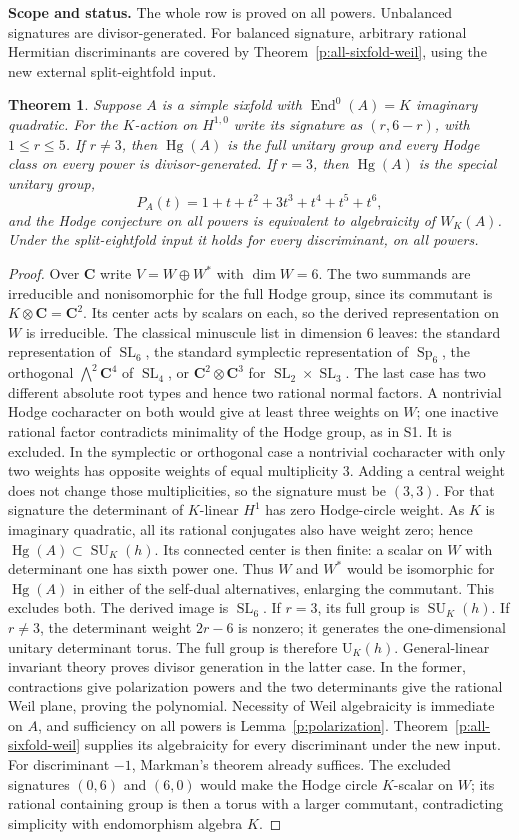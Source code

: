 \documentclass[10pt,reqno]{article}
\theoremstyle{emphasizedplain}
\newtheorem{theorem}{Theorem}[section]
\theoremstyle{emphasizeddefinition}
\theoremstyle{emphasizeddefinition}
\DeclareMathOperator{\End}{End}
\DeclareMathOperator{\Hg}{Hg}
\DeclareMathOperator{\Sp}{Sp}
\DeclareMathOperator{\SL}{SL}
\DeclareMathOperator{\SU}{SU}
\newcommand{\C}{\mathbf C}
\newcommand{\status}[1]{%
  \par\nobreak\smallskip\noindent
  {\setlength{\fboxsep}{7pt}%
   \colorbox{ScopeBackground}{%
    \parbox{\dimexpr\linewidth-2\fboxsep\relax}{%
     \small\textbf{\textcolor{HeadingInk}{Scope and status.}} #1}}}%
  \par\nobreak\medskip}
\renewcommand{\small}{\fontsize{8.4}{10}\selectfont}
\begin{document}
\status{The whole row is proved on all powers. Unbalanced signatures
are divisor-generated. For balanced signature, arbitrary rational
Hermitian discriminants are covered by Theorem~\ref{p:all-sixfold-weil},
using the new external split-eightfold input.}
\begin{theorem}\label{t:S8}
Suppose $A$ is a simple sixfold with $\End^0(A)=K$ imaginary quadratic.
For the $K$-action on $H^{1,0}$ write its signature as $(r,6-r)$, with
$1\leq r\leq5$. If $r\ne3$, then $\Hg(A)$ is the full unitary group
and every Hodge class on every power is divisor-generated.
If $r=3$, then $\Hg(A)$ is the special unitary group,
\[
 P_A(t)=1+t+t^2+3t^3+t^4+t^5+t^6,
\]
and the Hodge conjecture on all powers is equivalent to algebraicity of
$W_K(A)$. Under the split-eightfold input it holds for every
discriminant, on all powers.
\end{theorem}
\begin{proof}
Over $\C$ write $V=W\oplus W^*$ with $\dim W=6$. The two summands are
irreducible and nonisomorphic for the full Hodge group, since its commutant
is $K\otimes\C=\C^2$. Its center acts by scalars on each, so the derived
representation on $W$ is irreducible.
The classical minuscule list in dimension $6$ leaves: the standard
representation of $\SL_6$, the standard symplectic representation of
$\Sp_6$, the orthogonal $\bigwedge^2\C^4$ of $\SL_4$, or
$\C^2\otimes\C^3$ for $\SL_2\times\SL_3$.
The last case has two different absolute root types and hence two rational
normal factors. A nontrivial Hodge cocharacter on both would give at least
three weights on $W$; one inactive rational factor contradicts minimality
of the Hodge group, as in S1. It is excluded.
In the symplectic or orthogonal case a nontrivial cocharacter with only
two weights has opposite weights of equal multiplicity $3$. Adding a
central weight does not change those multiplicities, so the signature must
be $(3,3)$. For that signature the determinant of $K$-linear $H^1$ has zero
Hodge-circle weight. As $K$ is imaginary quadratic, all its rational
conjugates also have weight zero; hence $\Hg(A)\subset\SU_K(h)$.
Its connected center is then finite: a scalar on $W$ with determinant one
has sixth power one. Thus $W$ and $W^*$ would be isomorphic for $\Hg(A)$
in either of the self-dual alternatives, enlarging the commutant. This
excludes both. The derived image is $\SL_6$.
If $r=3$, its full group is $\SU_K(h)$. If $r\ne3$, the determinant weight
$2r-6$ is nonzero; it generates the one-dimensional unitary determinant
torus. The full group is therefore $\mathrm U_K(h)$.
General-linear invariant theory proves divisor generation in the latter
case. In the former, contractions give polarization powers and the two
determinants give the rational Weil plane, proving the polynomial.
Necessity of Weil algebraicity is immediate on $A$, and sufficiency on all
powers is Lemma~\ref{p:polarization}. Theorem~\ref{p:all-sixfold-weil}
supplies its algebraicity for every discriminant under the new input.
For discriminant $-1$, Markman's theorem already suffices.
The excluded signatures $(0,6)$ and $(6,0)$ would make the Hodge circle
$K$-scalar on $W$; its rational containing group is then a torus with a
larger commutant, contradicting simplicity with endomorphism algebra $K$.
\end{proof}
\end{document}
